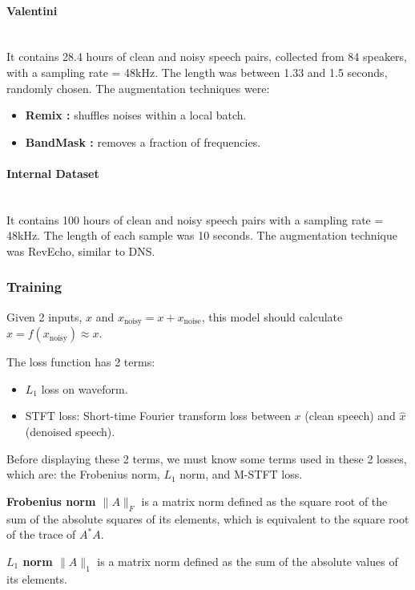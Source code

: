 \paragraph{Valentini}\mbox{}\\
It contains 28.4 hours of clean and noisy speech pairs, collected from 84 speakers, with a sampling rate = 48kHz. The length was between 1.33 and 1.5 seconds, randomly chosen. The augmentation techniques were:
\begin{itemize}
    \item \textbf{Remix :} shuffles noises within a local batch.
    \item \textbf{BandMask :} removes a fraction of frequencies.
\end{itemize}

\paragraph{Internal Dataset}\mbox{}\\
It contains 100 hours of clean and noisy speech pairs with a sampling rate = 48kHz. The length of each sample was 10 seconds. The augmentation technique was RevEcho, similar to DNS.

\subsubsection{Training}
Given 2 inputs, $x$ and $x_{\text{noisy}} = x + x_{\text{noise}}$, this model should calculate $\hat{x} = f(x_{\text{noisy}}) \approx x$.

The loss function has 2 terms:
\begin{itemize}
    \item $L_1$ loss on waveform.
    \item STFT loss: Short-time Fourier transform loss between $x$ (clean speech) and $\hat{x}$ (denoised speech).
\end{itemize}

Before displaying these 2 terms, we must know some terms used in these 2 losses, which are: the Frobenius norm, $L_1$ norm, and M-STFT loss.

\textbf{Frobenius norm $\lVert A \rVert_F$} is a matrix norm defined as the square root of the sum of the absolute squares of its elements, which is equivalent to the square root of the trace of $A^*A$.

\textbf{$L_1$ norm $\lVert A \rVert_1$} is a matrix norm defined as the sum of the absolute values of its elements.

